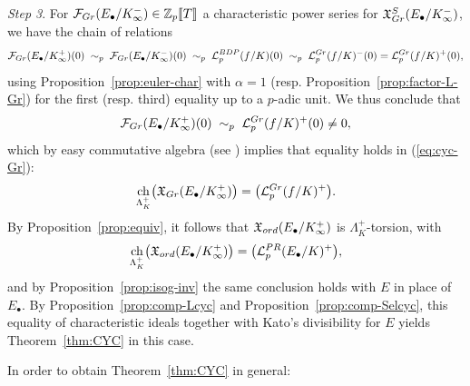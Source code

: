 \documentclass[a4paper,10pt]{amsart}
\numberwithin{equation}{section}
\numberwithin{equation}{section}
\theoremstyle{plain}
\theoremstyle{definition}
\theoremstyle{definition}
\theoremstyle{plain}
\theoremstyle{plain}
\theoremstyle{plain}
\theoremstyle{plain}
\newcommand{\Z}{\mathbb{Z}}
\newcommand{\X}{\mathfrak{X}}
\newcommand{\sk}{\vspace{0.1in}}
\DeclareMathOperator{\ch}{ch}
\newcommand{\Lcal}{\mathcal{L}}
\newcommand{\Fcal}{\mathcal{F}}
\begin{document}
\noindent\emph{Step 3}. For $\Fcal_{\rm Gr}(E_\bullet/K_\infty^-)\in\Z_p\llbracket{T}\rrbracket$ a characteristic power series for $\X_{\rm Gr}^S(E_\bullet/K_\infty^-)$, we have the chain of relations 
\[
\Fcal_{\rm Gr}(E_\bullet/K_\infty^+)(0)\;\sim_p\;
\Fcal_{\rm Gr}(E_\bullet/K_\infty^-)(0)\;\sim_p\;\Lcal_p^{\rm BDP}(f/K)(0)\;\sim_p\;\Lcal_p^{\rm Gr}(f/K)^{-}(0)=\Lcal_p^{\rm Gr}(f/K)^+(0),
\]
using Proposition~\ref{prop:euler-char} with $\alpha=1$ (resp. Proposition~\ref{prop:factor-L-Gr}) for the first (resp. third) equality up to a $p$-adic unit. 
%
We thus conclude that
\[
\Fcal_{\rm Gr}(E_\bullet/K_\infty^+)(0)\;\sim_p\;\Lcal_p^{\rm Gr}(f/K)^{+}(0)\neq 0,
\]
which by easy commutative algebra (see \cite[Lem.~3.2]{skinner-urban}) implies that equality holds in (\ref{eq:cyc-Gr}):
\[
\ch_{\Lambda_K^+}\bigl(\X_{\rm Gr}(E_\bullet/K_\infty^+)\bigr)=\bigl(\Lcal_p^{\rm Gr}(f/K)^{+}\bigr).
\]
By Proposition~\ref{prop:equiv}, it follows that $\X_{\rm ord}(E_\bullet/K_\infty^+)$ is $\Lambda_K^+$-torsion, with
\[
\ch_{\Lambda_K^+}\bigl(\X_{\rm ord}(E_\bullet/K_\infty^+)\bigr)=\bigl(\Lcal_p^{\rm PR}(E_\bullet/K)^+\bigr),
\]
and by Proposition~\ref{prop:isog-inv} the same conclusion holds with $E$ in place of $E_\bullet$. By Proposition~\ref{prop:comp-Lcyc} and Proposition~\ref{prop:comp-Selcyc}, this equality of characteristic ideals together with Kato's divisibility for $E$ yields Theorem~\ref{thm:CYC} in this case. 
\sk

In order to obtain Theorem~\ref{thm:CYC} in general:
\end{document}
